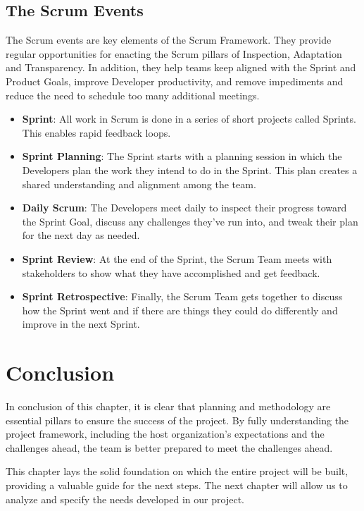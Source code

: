 \subsection{The Scrum Events}

The Scrum events are key elements of the Scrum Framework. They provide regular opportunities for enacting the Scrum pillars of Inspection, Adaptation and Transparency. In addition, they help teams keep aligned with the Sprint and Product Goals, improve Developer productivity, and remove impediments and reduce the need to schedule too many additional meetings.

\begin{itemize}
    \item \textbf{Sprint}: All work in Scrum is done in a series of short projects called Sprints. This enables rapid feedback loops.
    
    \item \textbf{Sprint Planning}: The Sprint starts with a planning session in which the Developers plan the work they intend to do in the Sprint. This plan creates a shared understanding and alignment among the team.
    
    \item \textbf{Daily Scrum}: The Developers meet daily to inspect their progress toward the Sprint Goal, discuss any challenges they've run into, and tweak their plan for the next day as needed.
    
    \item \textbf{Sprint Review}: At the end of the Sprint, the Scrum Team meets with stakeholders to show what they have accomplished and get feedback.
    
    \item \textbf{Sprint Retrospective}: Finally, the Scrum Team gets together to discuss how the Sprint went and if there are things they could do differently and improve in the next Sprint.
\end{itemize}

\section{Conclusion}

In conclusion of this chapter, it is clear that planning and methodology are essential pillars to ensure the success of the project. By fully understanding the project framework, including the host organization's expectations and the challenges ahead, the team is better prepared to meet the challenges ahead.

This chapter lays the solid foundation on which the entire project will be built, providing a valuable guide for the next steps. The next chapter will allow us to analyze and specify the needs developed in our project. 